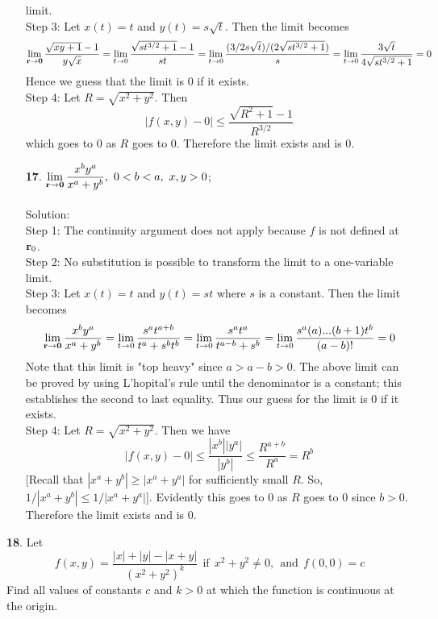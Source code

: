 \documentclass[12pt]{amsbook}
\begin{document}
\begin{enumerate}
limit.
\\
{\sf Step 3}: Let $x(t)=t$ and $y(t)=s\sqrt{t}$. Then the limit becomes
$$\lim_{{\bf r} \rightarrow {\bf 0}}\frac{\sqrt{xy+1}-1}{y\sqrt{x}}=\lim_{t \rightarrow 0}\frac{\sqrt{st^{3/2}+1}-1}{st}=\lim_{t \rightarrow 0}\frac{(3/2s\sqrt{t})/(2\sqrt{st^{3/2}+1})}{s}=\lim_{t \rightarrow 0}\frac{3\sqrt{t}}{4\sqrt{st^{3/2}+1}}=0$$
Hence we guess that the limit is $0$ if it exists.
\\
{\sf Step 4}: Let $R=\sqrt{x^2+y^2}$. Then
$$|f(x,y)-0| \leq \frac{\sqrt{R^2+1}-1}{R^{3/2}}$$
which goes to $0$ as $R$ goes to $0$. Therefore the limit exists and is $0$.
\\
\item[{\small\bf 17}.] $\! \begin{aligned}[t]
\lim_{{\bf r} \rightarrow {\bf 0}}\frac{x^by^a}{x^a+y^b}, \ 0<b<a, \ x,y>0 \end{aligned}$;
\\
\\
{\sc Solution}:
\\
{\sf Step 1}: The continuity argument does not apply because $f$ is not defined at ${\bf r}_0$.
\\
{\sf Step 2}: No substitution is possible to transform the limit to a one-variable
limit.
\\
{\sf Step 3}: Let $x(t)=t$ and $y(t)=st$ where $s$ is a constant. Then the limit becomes
$$\lim_{{\bf r} \rightarrow {\bf 0}}\frac{x^by^a}{x^a+y^b}=\lim_{t \rightarrow 0}\frac{s^at^{a+b}}{t^a+s^bt^b}=\lim_{t \rightarrow 0}\frac{s^at^{a}}{t^{a-b}+s^b}=\lim_{t \rightarrow 0}\frac{s^a(a)...(b+1)t^{b}}{(a-b)!}=0$$
Note that this limit is "top heavy" since $a>a-b>0$. The above limit can be proved by using L'hopital's rule until the denominator is a constant; this establishes the second to last equality. Thus our guess for the limit is $0$ if it exists.
\\
{\sf Step 4}: Let $R=\sqrt{x^2+y^2}$. Then we have
$$|f(x,y)-0|\leq \frac{|x^b||y^a|}{|y^b|}\leq \frac{R^{a+b}}{R^a}=R^b$$
[Recall that $|x^a+y^b| \geq |x^a+y^a|$ for sufficiently small $R$. So, $1/|x^a+y^b|  \leq 1/|x^a+y^a|$]. Evidently this goes to $0$ as $R$ goes to $0$ since $b>0$. Therefore the limit exists and is $0$.
\end{enumerate}
\noindent
{\small\bf 18}. Let
$$f(x,y)=\frac{|x|+|y|-|x+y|}{(x^2+y^2)^k} \ \ \text{if} \ \ x^2+y^2 \neq 0, \ \ \text{and} \ \ f(0,0)=c$$
Find all values of constants $c$ and $k > 0$ at which the function is continuous
at the origin.
\\
\end{document}
